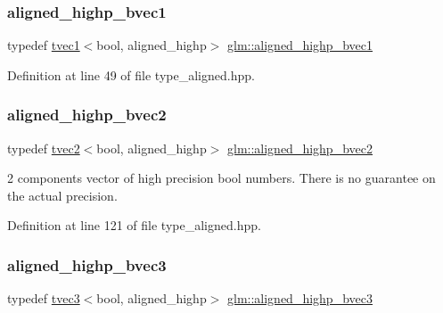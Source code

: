 \subsubsection{\texorpdfstring{aligned\_highp\_bvec1}{aligned\_highp\_bvec1}}
{\footnotesize\ttfamily typedef \mbox{\hyperlink{structglm_1_1tvec1}{tvec1}}$<$bool, aligned\+\_\+highp$>$ \mbox{\hyperlink{group__gtc__type__aligned_ga3e78791d8be2a1766bc7bc9d666f0f7f}{glm\+::aligned\+\_\+highp\+\_\+bvec1}}}



Definition at line 49 of file type\+\_\+aligned.\+hpp.

\mbox{\label{group__gtc__type__aligned_ga0864e6acd440d07a7eff815da8990467}} 
\subsubsection{\texorpdfstring{aligned\_highp\_bvec2}{aligned\_highp\_bvec2}}
{\footnotesize\ttfamily typedef \mbox{\hyperlink{structglm_1_1tvec2}{tvec2}}$<$bool, aligned\+\_\+highp$>$ \mbox{\hyperlink{group__gtc__type__aligned_ga0864e6acd440d07a7eff815da8990467}{glm\+::aligned\+\_\+highp\+\_\+bvec2}}}

2 components vector of high precision bool numbers. There is no guarantee on the actual precision. 

Definition at line 121 of file type\+\_\+aligned.\+hpp.

\mbox{\label{group__gtc__type__aligned_gadd773554f8ca95a959a269252ad20738}} 
\subsubsection{\texorpdfstring{aligned\_highp\_bvec3}{aligned\_highp\_bvec3}}
{\footnotesize\ttfamily typedef \mbox{\hyperlink{structglm_1_1tvec3}{tvec3}}$<$bool, aligned\+\_\+highp$>$ \mbox{\hyperlink{group__gtc__type__aligned_gadd773554f8ca95a959a269252ad20738}{glm\+::aligned\+\_\+highp\+\_\+bvec3}}}




